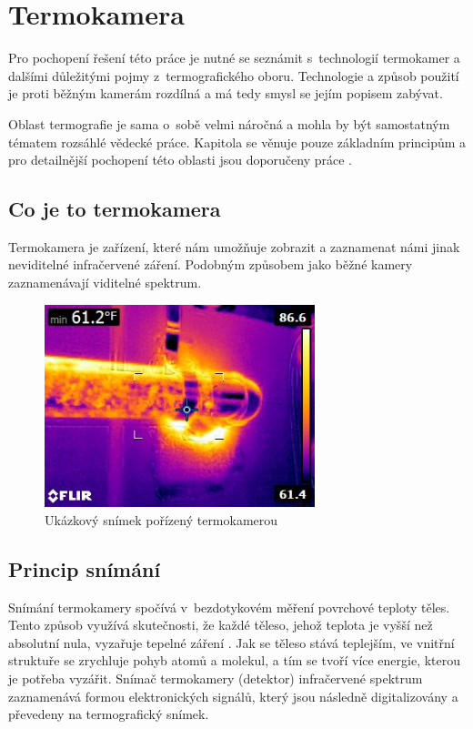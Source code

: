 \chapter{Termokamera}
Pro pochopení řešení této práce je nutné se seznámit s~technologií termokamer a dalšími důležitými pojmy  z~termografického oboru. Technologie a způsob použití je proti běžným kamerám rozdílná a má tedy smysl se jejím popisem zabývat.

Oblast termografie je sama o~sobě velmi náročná a mohla by být samostatným tématem rozsáhlé vědecké práce. Kapitola se věnuje pouze základním principům a pro detailnější pochopení této oblasti jsou doporučeny práce \cite{kaplan2007practical,gaussorgues2012infrared,vollmer2010infrared}.

\section{Co je to termokamera}
Termokamera je zařízení, které nám umožňuje zobrazit a zaznamenat námi jinak neviditelné infračervené záření. Podobným způsobem jako běžné kamery zaznamenávají viditelné spektrum. 

\begin{figure}[h]
  \centering
  \includegraphics[width=0.7\textwidth]{images/thermal_camera_sample_image.jpg}
  \caption{Ukázkový snímek pořízený termokamerou \cite{thermalSampleImage}}
\end{figure}

\section{Princip snímání} \label{section:measurement_principle}
Snímání termokamery spočívá v~bezdotykovém měření povrchové teploty těles. Tento způsob využívá skutečnosti, že každé těleso, jehož teplota je vyšší než absolutní nula, vyzařuje tepelné záření \cite{puhl2015bezkontaktni, kadleckzadkladymereni1}. Jak se těleso stává teplejším, ve vnitřní struktuře se zrychluje pohyb atomů a molekul, a tím se tvoří více energie, kterou je potřeba vyzářit. Snímač termokamery (detektor) infračervené spektrum zaznamenává formou elektronických signálů, který jsou následně digitalizovány a převedeny na termografický snímek. 

